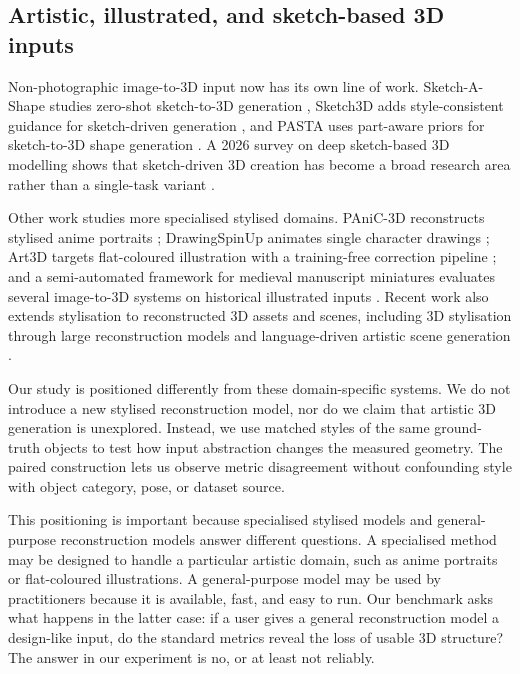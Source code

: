 \documentclass[12pt,a4paper]{article}
\begin{document}
\subsection{Artistic, illustrated, and sketch-based 3D inputs}

Non-photographic image-to-3D input now has its own line of work. Sketch-A-Shape studies zero-shot sketch-to-3D generation \parencite{sanghi2023sketchashape}, Sketch3D adds style-consistent guidance for sketch-driven generation \parencite{zheng2024sketch3d}, and PASTA uses part-aware priors for sketch-to-3D shape generation \parencite{lee2025pasta}. A 2026 survey on deep sketch-based 3D modelling shows that sketch-driven 3D creation has become a broad research area rather than a single-task variant \parencite{tono2026sketchsurvey}.

Other work studies more specialised stylised domains. PAniC-3D reconstructs stylised anime portraits \parencite{chen2023panic3d}; DrawingSpinUp animates single character drawings \parencite{zhou2024drawingspinup}; Art3D targets flat-coloured illustration with a training-free correction pipeline \parencite{cong2025art3d}; and a semi-automated framework for medieval manuscript miniatures evaluates several image-to-3D systems on historical illustrated inputs \parencite{pallotto2026miniatures}. Recent work also extends stylisation to reconstructed 3D assets and scenes, including 3D stylisation through large reconstruction models and language-driven artistic scene generation \parencite{oztas2025stylizationlrm,li2025artiscene}.

Our study is positioned differently from these domain-specific systems. We do not introduce a new stylised reconstruction model, nor do we claim that artistic 3D generation is unexplored. Instead, we use matched styles of the same ground-truth objects to test how input abstraction changes the measured geometry. The paired construction lets us observe metric disagreement without confounding style with object category, pose, or dataset source.

This positioning is important because specialised stylised models and general-purpose reconstruction models answer different questions. A specialised method may be designed to handle a particular artistic domain, such as anime portraits or flat-coloured illustrations. A general-purpose model may be used by practitioners because it is available, fast, and easy to run. Our benchmark asks what happens in the latter case: if a user gives a general reconstruction model a design-like input, do the standard metrics reveal the loss of usable 3D structure? The answer in our experiment is no, or at least not reliably.
\end{document}
